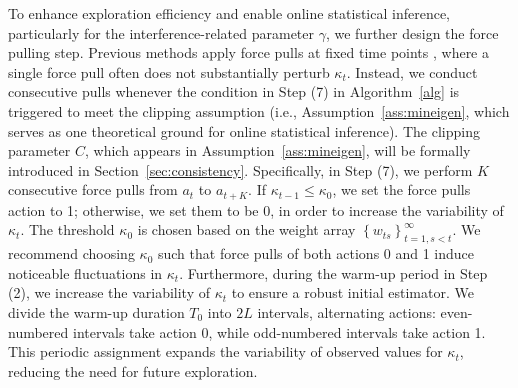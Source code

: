 \documentclass[12pt]{article}
\begin{document}
To enhance exploration efficiency and enable online statistical inference, particularly for the interference-related parameter $\gamma$, we further design the force pulling step. Previous methods apply force pulls at fixed time points \citep[see e.g.,][]{bastani2020,hu2022dtr}, where a single force pull often does not substantially perturb $ \kappa_t$. Instead, we conduct consecutive pulls whenever the condition in Step (7) in Algorithm~\ref{alg} is triggered to meet the clipping assumption (i.e., Assumption~\ref{ass:mineigen}, which serves as one theoretical ground for online statistical inference). The clipping parameter $C$, which appears in Assumption~\ref{ass:mineigen}, will be formally introduced in Section~\ref{sec:consistency}. Specifically, in Step (7), we perform $K$ consecutive force pulls from $a_t$ to $a_{t+K}$. If $ \kappa_{t-1} \leq \kappa_0$, we set the force pulls action to 1; otherwise, we set them to be 0, in order to increase the variability of $ \kappa_t$. The threshold $\kappa_0$ is chosen based on the weight array $\left\{w_{ts}\right\}_{t=1,s<t}^\infty$. We recommend choosing $\kappa_0$ such that force pulls of both actions 0 and 1 induce noticeable fluctuations in $\kappa_t$. 
Furthermore, during the warm-up period in Step (2), we increase the variability of \(  \kappa_t \) to ensure a robust initial estimator. We divide the warm-up duration \( T_0 \) into \( 2L \) intervals, alternating actions: even-numbered intervals take action 0, while odd-numbered intervals take action 1. This periodic assignment expands the variability of observed values for \(  \kappa_t \), reducing the need for future exploration. 
\end{document}

